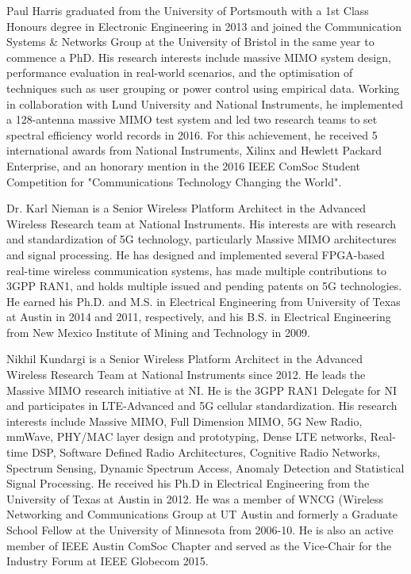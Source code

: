 \documentclass[journal]{IEEEtran}
\begin{document}
%
\begin{IEEEbiography}{Paul Harris} 
	graduated from the University of Portsmouth with a 1st Class Honours degree in Electronic Engineering in 2013 and joined the Communication Systems \& Networks Group at the University of Bristol in the same year to commence a PhD. His research interests include massive MIMO system design, performance evaluation in real-world scenarios, and the optimisation of techniques such as user grouping or power control using empirical data. Working in collaboration with Lund University and National Instruments, he implemented a 128-antenna massive MIMO test system and led two research teams to set spectral efficiency world records in 2016. For this achievement, he received 5 international awards from National Instruments, Xilinx and Hewlett Packard Enterprise, and an honorary mention in the 2016 IEEE ComSoc Student Competition for "Communications Technology Changing the World".
\end{IEEEbiography}
%
\begin{IEEEbiography}{Dr. Karl Nieman}
	is a Senior Wireless Platform Architect in the Advanced Wireless Research team at National Instruments.  His interests are with research and standardization of 5G technology, particularly Massive MIMO architectures and signal processing.  He has designed and implemented several FPGA-based real-time wireless communication systems, has made multiple contributions to 3GPP RAN1, and holds multiple issued and pending patents on 5G technologies.  He earned his Ph.D. and M.S. in Electrical Engineering from University of Texas at Austin in 2014 and 2011, respectively, and his B.S. in Electrical Engineering from New Mexico Institute of Mining and Technology in 2009. 
\end{IEEEbiography}
%
\begin{IEEEbiography}{Nikhil Kundargi}
	is a Senior Wireless Platform Architect in the Advanced Wireless Research Team at National Instruments since 2012. 
	He leads the Massive MIMO research initiative at NI. He is the 3GPP RAN1 Delegate for NI and participates in LTE-Advanced and 5G cellular standardization. His research interests include Massive MIMO, Full Dimension MIMO, 5G New Radio, mmWave, PHY/MAC layer design and prototyping, Dense LTE networks,  Real-time DSP, Software Defined Radio Architectures, Cognitive Radio Networks, Spectrum Sensing, Dynamic Spectrum Access, Anomaly Detection and Statistical Signal Processing. 
	He received his Ph.D in Electrical Engineering from the University of Texas at Austin in 2012. He was a member of WNCG (Wireless Networking and Communications Group at UT Austin and formerly a Graduate School Fellow at the University of Minnesota from 2006-10.  He is also an active member of IEEE Austin ComSoc Chapter and served as the Vice-Chair for the Industry Forum at IEEE Globecom 2015.
\end{IEEEbiography}
\end{document}
